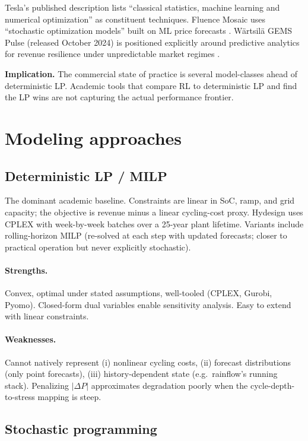 \documentclass[11pt]{article}
\begin{document}
Tesla's published description \citep{tesla2024autobidder} lists ``classical statistics, machine learning and numerical optimization'' as constituent techniques. Fluence Mosaic uses ``stochastic optimization models'' built on ML price forecasts \citep{fluence2024mosaic}. W\"{a}rtsil\"{a} GEMS Pulse (released October 2024) is positioned explicitly around predictive analytics for revenue resilience under unpredictable market regimes \citep{wartsila2025gems}.

\textbf{Implication.} The commercial state of practice is several model-classes ahead of deterministic LP. Academic tools that compare RL to deterministic LP and find the LP wins are not capturing the actual performance frontier.

\section{Modeling approaches}

\subsection{Deterministic LP / MILP}

The dominant academic baseline. Constraints are linear in SoC, ramp, and grid capacity; the objective is revenue minus a linear cycling-cost proxy. Hydesign \citep{murcia2024hydesign} uses CPLEX with week-by-week batches over a 25-year plant lifetime. Variants include rolling-horizon MILP (re-solved at each step with updated forecasts; closer to practical operation but never explicitly stochastic).

\paragraph{Strengths.} Convex, optimal under stated assumptions, well-tooled (CPLEX, Gurobi, Pyomo). Closed-form dual variables enable sensitivity analysis. Easy to extend with linear constraints.

\paragraph{Weaknesses.} Cannot natively represent (i) nonlinear cycling costs, (ii) forecast distributions (only point forecasts), (iii) history-dependent state (e.g.\ rainflow's running stack). Penalizing $|\Delta P|$ approximates degradation poorly when the cycle-depth-to-stress mapping is steep.

\subsection{Stochastic programming}
\end{document}
